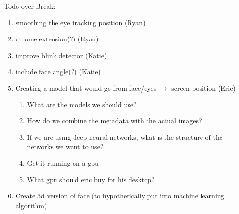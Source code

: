 Todo over Break: 
\begin{enumerate}
\item smoothing the eye tracking position (Ryan)
\item chrome extension(?) (Ryan)
\item improve blink detector (Katie)
\item include face angle(?) (Katie)
\item Creating a model that would go from face/eyes $\rightarrow$ screen position (Eric)
\begin{enumerate}
    \item What are the models we should use?
    \item How do we combine the metadata with the actual images?
    \item If we are using deep neural networks, what is the structure of the networks we want to use?
    \item Get it running on a gpu
    \item What gpu should eric buy for his desktop?
    
\end{enumerate}
\item Create 3d version of face (to hypothetically put into machine learning algorithm)
\end{enumerate}

